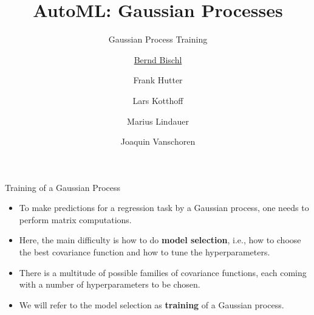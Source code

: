 



\newcommand{\lz}{\vspace{0.5cm}}
\newcommand{\thetab}{\bm{\weights}}
\newcommand{\zero}{\mathbf{0}}
\newcommand{\Xmat}{\mathbf{X}}
\newcommand{\ydat}{\mathbf{y}}
\newcommand{\id}{\boldsymbol{I}}
\newcommand{\Amat}{\mathbf{A}}
\newcommand{\Xspace}{\mathcal{X}}
\newcommand{\Yspace}{\mathcal{Y}}
\newcommand{\ls}{\ell}
\newcommand{\natnum}{\mathbb{N}}
\newcommand{\intnum}{\mathbb{Z}}
\newcommand{\order}{\mathcal{O}}

\usepackage{fontawesome}
\usepackage{dirtytalk}
\usepackage{csquotes}


\def\argmin{\mathop{\sf arg\,min}}




\title[AutoML: GPs]{AutoML: Gaussian Processes} %
\subtitle{Gaussian Process Training} %
\author[Marius Lindauer]{\underline{Bernd Bischl} \and Frank Hutter \and Lars Kotthoff\newline \and Marius Lindauer \and Joaquin Vanschoren}
\institute{}
\date{}




\maketitle



\begin{frame}[c]{Training of a Gaussian Process}

\begin{itemize}
\vspace{.5cm}
\item To make predictions for a regression task by a Gaussian process, one needs to perform matrix computations.
\vspace{.5cm}
\item Here, the main difficulty is how to do \textbf{model selection}, i.e., how to choose the best covariance function and how to tune the hyperparameters.
\vspace{.5cm}
\item There is a multitude of possible families of covariance functions, each coming with a number of hyperparameters to be chosen.
\vspace{.5cm}
\item We will refer to the model selection as \textbf{training} of a Gaussian process.
\end{itemize}


\end{frame}

